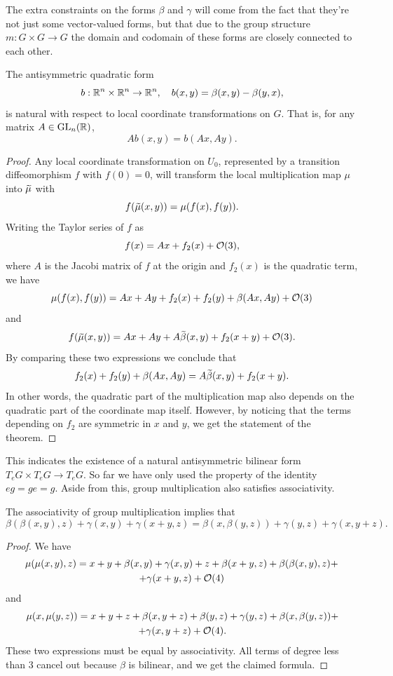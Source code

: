 The extra constraints on the forms $\beta$ and $\gamma$ will come from the fact that they're not just some vector-valued forms, but that due to the group structure $m:G\times G\to G$ the domain and codomain of these forms are closely connected to each other. 



\begin{lem}
    The antisymmetric quadratic form
    \[b:\mathbb{R}^n\times\mathbb{R}^n\to \mathbb{R}^n,\quad b(x,y)=\beta(x,y)-\beta(y,x),\]
    is natural with respect to local coordinate transformations on $G$. That is, for any matrix $A\in\operatorname{GL}_n(\mathbb{R})$,
    \[A b(x,y)=b(Ax,Ay).\]
\end{lem}
\begin{proof}
    Any local coordinate transformation on $U_0$, represented by a transition diffeomorphism $f$ with $f(0)=0$, will transform the local multiplication map $\mu$ into $\wt{\mu}$ with
    \[f(\wt\mu(x,y))=\mu(f(x),f(y)).\]
    Writing the Taylor series of $f$ as
    \[f(x)=Ax+f_2(x)+\mathcal{O}(3),\]
    where $A$ is the Jacobi matrix of $f$ at the origin and $f_2(x)$ is the quadratic term, we have
    \[\mu(f(x),f(y))=Ax+Ay+f_2(x)+f_2(y)+\beta(Ax,Ay)+\mathcal{O}(3)\]
    and
    \[f(\wt\mu(x,y))=Ax+Ay+A\wt\beta(x,y)+f_2(x+y)+\calO(3).\]
    By comparing these two expressions we conclude that
    \[f_2(x)+f_2(y)+\beta(Ax,Ay)=A\wt\beta(x,y)+f_2(x+y).\]
    In other words, the quadratic part of the multiplication map also depends on the quadratic part of the coordinate map itself. However, by noticing that the terms depending on $f_2$ are symmetric in $x$ and $y$, we get the statement of the theorem.
\end{proof}

This indicates the existence of a natural antisymmetric bilinear form $T_e G\times T_eG\to T_e G$. So far we have only used the property of the identity $eg=ge=g$. Aside from this, group multiplication also satisfies associativity.

\begin{lem}\label{3975}
    The associativity of group multiplication implies that
    \[
        \beta(\beta(x,y),z)+\gamma(x,y)+\gamma(x+y,z)
        =\beta(x,\beta(y,z))+\gamma(y,z)+\gamma(x,y+z).
    \]
\end{lem}
\begin{proof}
    We have 
    \begin{multline}
        \mu(\mu(x,y),z)=x+y+\beta(x,y)+\gamma(x,y)
        +z+\beta(x+y,z)+\beta(\beta(x,y),z)+\\+\gamma(x+y,z)+\mathcal{O}(4)
    \end{multline}
    and 
    \begin{multline}
        \mu(x,\mu(y,z))=x+y+z+\beta(x,y+z)+\beta(y,z)
        +\gamma(y,z)+\beta(x,\beta(y,z))+\\+\gamma(x,y+z)+\mathcal{O}(4).
    \end{multline}
    These two expressions must be equal by associativity. All terms of degree less than 3 cancel out because $\beta$ is bilinear, and we get the claimed formula.
\end{proof}

